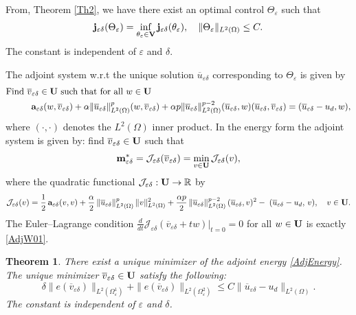 \documentclass[11pt,a4paper]{article}
\numberwithin{equation}{section}
\def\wo{\overline}
\def\O{\Omega}
\def\d{\delta}
\def\e{\varepsilon}
\def\a{{\alpha}}
\def\Ga{{\bf a}}
\def\R{{\mathbb{R}}}
\def\R{{\mathbb{R}}}
\def\Jc{{\mathcal{J}}}
\def\ed{{\varepsilon\delta}}
\def\Ga{{\bf a}}
\def\Gj{{\bf j}}
\def\Gm{{\bf m}}
\def\GU{{\bf U}}
\def\GV{{\bf V}}
\newtheorem{theorem}{Theorem}[section]
\begin{document}
	From, Theorem \ref{Th2}, we have there exist an optimal control $\Theta_\e$ such that
	$$\Gj_\ed(\Theta_\e)=\inf_{\theta_\e\in\GV}\Gj_\ed(\theta_\e),\quad \|\Theta_\e\|_{L^2(\O)}\leq C.$$
	The constant is independent of $\e$ and $\d$.
	
	The adjoint system w.r.t the unique solution $\wo u_\ed$ corresponding to $\Theta_\e$ is given by
	\begin{equation}\label{AdjW01}
		\begin{aligned}
			&\text{Find $\wo v_\ed\in \GU$ such that for all $w\in\GU$}\\
			&\hskip 10mm \Ga_\ed(w,\wo v_\ed)+\a\|\wo u_\ed\|^p_{L^2(\O)}(w,\wo v_\ed)+\a p\|\wo u_\ed\|^{p-2}_{L^2(\O)}(\wo u_\ed,w)(\wo u_\ed,\wo v_\ed)=(\wo u_\ed-u_d,w),	
		\end{aligned}
	\end{equation}
	where $(\cdot,\cdot)$ denotes the $L^2(\O)$ inner product. In the energy form the adjoint system is given by: find $\wo v_\ed\in\GU$ such that
	\[
	\Gm^\ast_\ed=\Jc_\ed(\wo v_\ed)=\min_{v\in\GU}\mathcal J_\ed(v),
	\]
	where the quadratic functional $\mathcal J_\ed:\GU\to\R$ by
	\begin{equation}\label{AdjEnergy}
		\mathcal J_\ed(v)
		=
		\frac12\,\Ga_\ed(v,v)
		+\frac{\a}{2}\,\|\wo u_\ed\|_{L^2(\O)}^{p}\,\|v\|_{L^2(\O)}^{2}
		+\frac{\a p}{2}\,\|\wo u_\ed\|_{L^2(\O)}^{p-2}\,(\wo u_\ed,v)^2
		-\;(\wo u_\ed-u_d,\,v),
		\quad v\in\GU.
	\end{equation}
	The Euler--Lagrange condition $\frac{d}{dt}\mathcal J_\ed(\wo v_\ed+t w)\big|_{t=0}=0$
	for all $w\in\GU$ is exactly \eqref{AdjW01}.
	\begin{theorem}
		There exist a unique minimizer of the adjoint energy \eqref{AdjEnergy}. The unique minimizer $\wo v_\ed\in\GU$ satisfy the following:
		\begin{equation}\label{EsA01}
			\d\|e(\wo v_\ed)\|_{L^2(\O^1_\e)}+\|e(\wo v_\ed)\|_{L^2(\O^2_\e)}\leq C\|\wo u_\ed-u_d\|_{L^2(\O)}.
		\end{equation}
		The constant is independent of $\e$ and $\d$.
	\end{theorem}
\end{document}
